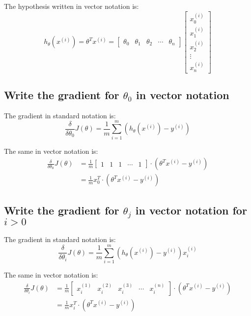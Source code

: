 \documentclass{article}
\begin{document}
	The hypothesis written in vector notation is:
	\begin{equation*}
	h_{\theta}(x^{(i)}) = \theta^T x^{(i)} = 
	\begin{bmatrix} 
		\theta_0 & \theta_1 & \theta_2 & \cdots & \theta_n
	\end{bmatrix}
	\begin{bmatrix}
		x_0^{(i)} \\
		x_1^{(i)} \\ 
		x_2^{(i)} \\ 
		\vdots \\
		 x_n^{(i)}
	\end{bmatrix}
	\end{equation*}

\subsection{Write the gradient for $\theta_0$ in vector notation}

	The gradient in standard notation is:
	\begin{equation*}
	\frac{\delta}{\delta\theta_0}J(\theta) = \frac{1}{m} \sum\limits_{i=1}^m (h _{\theta} (x ^{(i)}) - y ^{(i)})
	\end{equation*}

	The same in vector notation is:
	\begin{align*}
	\frac{\delta}{\delta\theta_0}J(\theta) &= \frac{1}{m} \begin{bmatrix} 
										1 & 1 & 1 & \cdots& 1
									\end{bmatrix}
	\cdot (\theta^T x^{(i)} - y ^{(i)})\\
	&=  \frac{1}{m}x_0^T\cdot (\theta^T x^{(i)} - y ^{(i)})
	\end{align*}

\subsection{Write the gradient for $\theta_j$ in vector notation for $i>0$}
	
	The gradient in standard notation is:
	\begin{equation*}
	\frac{\delta}{\delta\theta_i}J(\theta) = \frac{1}{m} \sum\limits_{i=1}^m (h _{\theta} (x ^{(i)}) - y ^{(i)})x_i^{(i)}
	\end{equation*}

	The same in vector notation is:
	\begin{align*}
	\frac{\delta}{\delta\theta_i}J(\theta) &= \frac{1}{m} \begin{bmatrix} 
										x_i^{(1)} & x_i^{(2)} & x_i^{(3)} & \cdots& x_i^{(n)}
									\end{bmatrix}
	\cdot (\theta^T x^{(i)} - y ^{(i)})\\
	&=  \frac{1}{m}x_i^T \cdot (\theta^T x^{(i)} - y ^{(i)})
	\end{align*}
\end{document}

